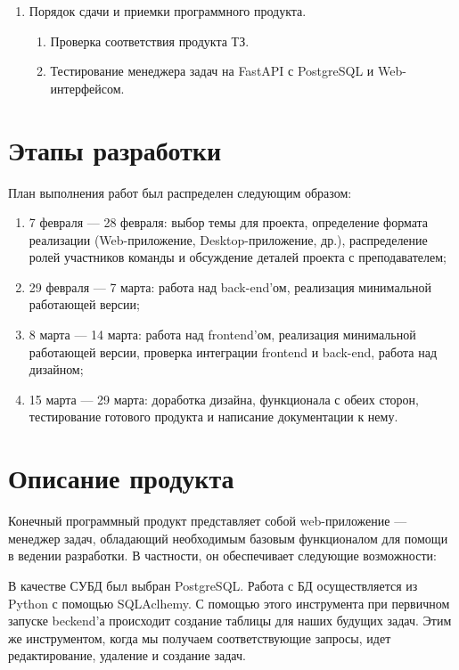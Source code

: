 \documentclass{altsu-report}
\begin{document}
\begin{enumerate}
    \item Порядок сдачи и приемки программного продукта.

    \begin{enumerate}
        \item Проверка соответствия продукта ТЗ.

        \item Тестирование менеджера задач на FastAPI с PostgreSQL и Web-интерфейсом.
    \end{enumerate}
\end{enumerate}

\chapter*{Этапы разработки}

План выполнения работ был распределен следующим образом:

\begin{enumerate}
    \item 7 февраля --- 28 февраля: выбор темы для проекта, определение формата реализации (Web-приложение, Desktop-приложение, др.), распределение ролей участников команды и обсуждение деталей проекта с преподавателем;

    \item 29 февраля --- 7 марта: работа над back-end'ом, реализация минимальной работающей версии;

    \item 8 марта --- 14 марта: работа над frontend'ом, реализация минимальной работающей версии, проверка интеграции frontend и back-end, работа над дизайном;

    \item 15 марта --- 29 марта: доработка дизайна, функционала с обеих сторон, тестирование готового продукта и написание документации к нему.
\end{enumerate}

\chapter*{Описание продукта}

Конечный программный продукт представляет собой web-приложение --- менеджер задач, обладающий необходимым базовым функционалом для помощи в ведении разработки. В частности, он обеспечивает следующие возможности:

В качестве СУБД был выбран PostgreSQL. Работа с БД осуществляется из Python с помощью SQLAclhemy. С помощью этого инструмента при первичном запуске beckend'а происходит создание таблицы для наших будущих задач. Этим же инструментом, когда мы получаем соответствующие запросы, идет редактирование, удаление и создание задач.
\end{document}
